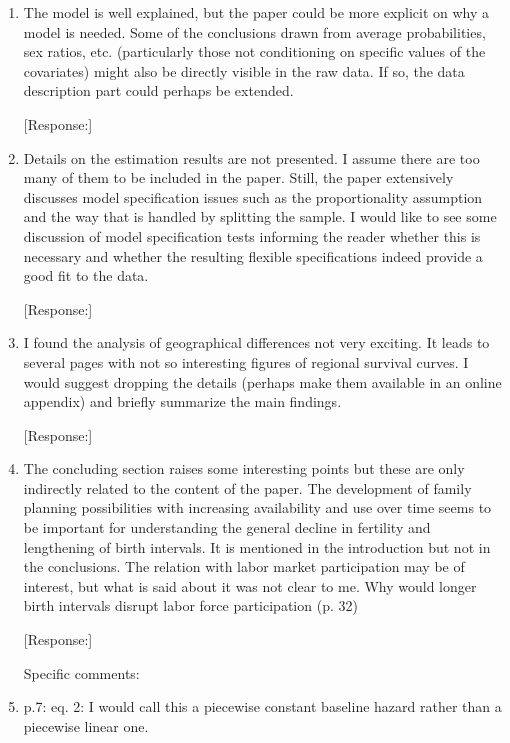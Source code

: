 \documentclass[letterpaper,12pt]{article}
\begin{document}
\begin{enumerate}

\item The model is well explained, but the paper could be more explicit
on why a model is needed. Some of the conclusions drawn from average
probabilities, sex ratios, etc. (particularly those not conditioning on
specific values of the covariates) might also be directly visible in the
raw data. If so, the data description part could perhaps be extended.

[Response:]


\item Details on the estimation results are not presented. I assume
there are too many of them to be included in the paper. Still, the paper
extensively discusses model specification issues such as the
proportionality assumption and the way that is handled by splitting the
sample. I would like to see some discussion of model specification tests
informing the reader whether this is necessary and whether the resulting
flexible specifications indeed provide a good fit to the data.


[Response:]



\item I found the analysis of geographical differences not very
exciting. It leads to several pages with not so interesting figures of
regional survival curves. I would suggest dropping the details (perhaps
make them available in an online appendix) and briefly summarize the
main findings.

[Response:]




\item The concluding section raises some interesting points but these
are only indirectly related to the content of the paper. The development
of family planning possibilities with increasing availability and use
over time seems to be important for understanding the general decline in
fertility and lengthening of birth intervals. It is mentioned in the
introduction but not in the conclusions. The relation with labor market
participation may be of interest, but what is said about it was not
clear to me. Why would longer birth intervals disrupt labor force
participation (p. 32)

[Response:]




Specific comments:


\item p.7: eq. 2: I would call this a piecewise constant baseline hazard
rather than a piecewise linear one.


\end{enumerate}
\end{document}
